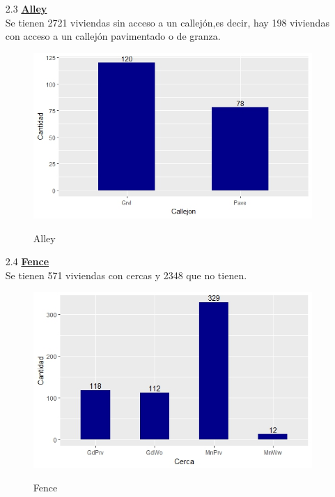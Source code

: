 \documentclass{report}
\begin{document}
\begin{itemize}
\begin{itemize}
\begin{itemize}
\newpage

\item[2.3] \textbf{\underline{Alley}} \\ 

Se tienen 2721 viviendas sin acceso a un callejón,es decir, hay 198 viviendas con acceso a un callejón pavimentado o de granza. \\

\begin{figure}[h]
	\centering
	\includegraphics[scale=0.8]{Callejon.JPEG}
	\label{p1}
	\caption{Alley}
\end{figure}


\item[2.4] \textbf{\underline{Fence}}\\

Se tienen 571 viviendas con cercas y 2348 que no tienen. \\

\begin{figure}[h]
	\centering
	\includegraphics[scale=0.8]{Cerca.JPEG}
	\label{p1}
	\caption{Fence}
\end{figure}


\end{itemize}
\end{itemize}
\end{itemize}
\end{document}
